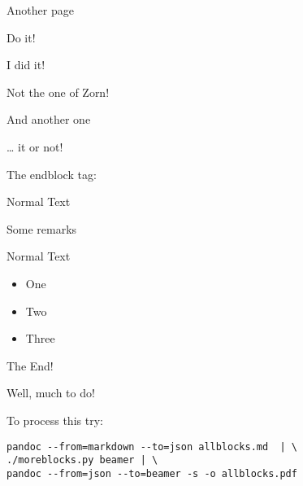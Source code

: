 \documentclass[10pt,english,ignorenonframetext,]{beamer}
\providecommand{\tightlist}{%
  \setlength{\itemsep}{0pt}\setlength{\parskip}{0pt}}
\begin{document}
\begin{frame}{Another page}

\begin{Uebung}[An exercise]\label{an-exercise}

Do it!

\end{Uebung}

\begin{Loesung}\label{the-solution}

I did it!

\end{Loesung}

\begin{Lemma}[Lemma]\label{lemma}

Not the one of Zorn!

\end{Lemma}

\end{frame}

\begin{frame}{And another one}

\begin{Beweis}\label{proof}

\ldots{} it or not!

\end{Beweis}

\end{frame}

\begin{frame}{The endblock tag:}

Normal Text

\begin{Bemerkung}[A Remark]\label{a-remark}

Some remarks

\end{Bemerkung}

Normal Text

\begin{Bemerkungen}\label{some-remarks}

\begin{itemize}
\tightlist
\item
  One
\item
  Two
\item
  Three
\end{itemize}

\end{Bemerkungen}

\end{frame}

\begin{frame}[fragile]{The End!}

Well, much to do!

To process this try:

\begin{verbatim}
pandoc --from=markdown --to=json allblocks.md  | \
./moreblocks.py beamer | \
pandoc --from=json --to=beamer -s -o allblocks.pdf
\end{verbatim}

\end{frame}
\end{document}
